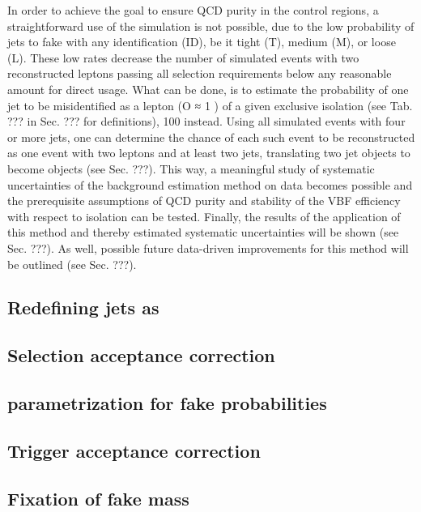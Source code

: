 In order to achieve the goal to ensure QCD purity in the control regions, a straightforward use of the simulation is not possible, due to the low probability of jets to fake \hadtau with any identification (ID), be it tight (T), medium (M), or loose (L). These low rates decrease the number of simulated events with two reconstructed \hadtau leptons passing all selection requirements below any reasonable amount for direct usage. What can be done, is to estimate the probability of one jet to be misidentified as a \hadtau lepton (O ≈ 1 ) of a given exclusive isolation (see Tab. ??? in Sec. ??? for definitions), 100 instead. Using all simulated events with four or more jets, one can determine the chance of each such event to be reconstructed as one event with two \hadtau leptons and at least two jets, translating two jet objects to become \hadtau objects (see Sec. ???). This way, a meaningful study of systematic uncertainties of the background estimation method on data becomes possible and the prerequisite assumptions of QCD purity and stability of the VBF efficiency with respect to \hadtaufake isolation can be tested. Finally, the results of the application of this method and thereby estimated systematic uncertainties will be shown (see Sec. ???). As well, possible future data-driven improvements for this method will be outlined (see Sec. ???).

\subsection*{Redefining jets as \hadtau}

\subsection*{Selection acceptance correction}

\subsection*{parametrization for fake probabilities}

\subsection*{Trigger acceptance correction}

\subsection*{Fixation of fake \hadtau mass}



